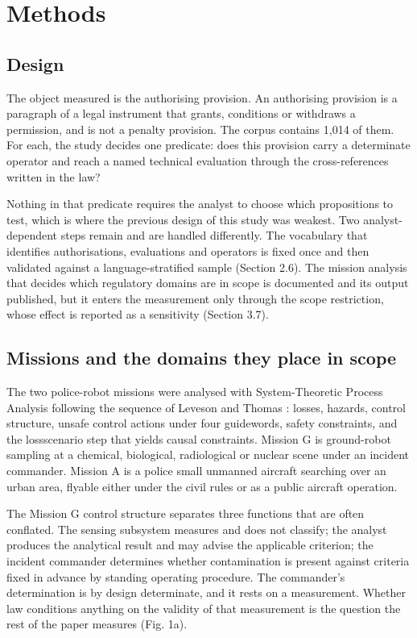 \section{Methods}\label{sec:2}

\subsection{Design}\label{sec:2.1}

The object measured is the authorising provision. An authorising provision is a paragraph of a legal instrument that grants, conditions or withdraws a permission, and is not a penalty provision. The corpus contains 1,014 of them. For each, the study decides one predicate: does this provision carry a determinate operator and reach a named technical evaluation through the cross-references written in the law?

Nothing in that predicate requires the analyst to choose which propositions to test, which is where the previous design of this study was weakest. Two analyst-dependent steps remain and are handled differently. The vocabulary that identifies authorisations, evaluations and operators is fixed once and then validated against a language-stratified sample (Section 2.6). The mission analysis that decides which regulatory domains are in scope is documented and its output published, but it enters the measurement only through the scope restriction, whose effect is reported as a sensitivity (Section 3.7).

\subsection{Missions and the domains they place in scope}\label{sec:2.2}

The two police-robot missions were analysed with System-Theoretic Process Analysis following the sequence of Leveson and Thomas \citep{LevesonThomas2018STPA}: losses, hazards, control structure, unsafe control actions under four guidewords, safety constraints, and the lossscenario step that yields causal constraints. Mission G is ground-robot sampling at a chemical, biological, radiological or nuclear scene under an incident commander. Mission A is a police small unmanned aircraft searching over an urban area, flyable either under the civil rules or as a public aircraft operation.

The Mission G control structure separates three functions that are often conflated. The sensing subsystem measures and does not classify; the analyst produces the analytical result and may advise the applicable criterion; the incident commander determines whether contamination is present against criteria fixed in advance by standing operating procedure. The commander's determination is by design determinate, and it rests on a measurement. Whether law conditions anything on the validity of that measurement is the question the rest of the paper measures (Fig. 1a).

